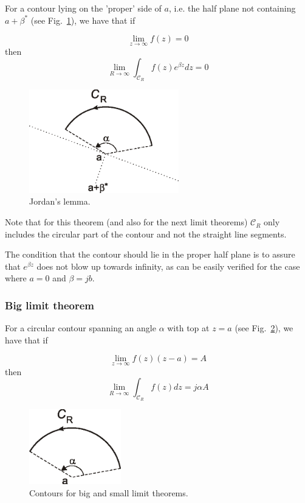 For a contour lying on the 'proper' side of $a$, i.e. the half plane not
containing $a+\beta^*$ (see Fig.~\ref{fig-jordan}), we have that if  

\begin{equation}
\lim_{z \to \infty} f(z) = 0
\end{equation}
then
\begin{equation}
\lim_{R \to \infty} \int_{\mathcal{C}_R} f(z) e^{\beta z} dz = 0
\end{equation}

\begin{figure}
\centering
\includegraphics[width=6.5cm]{complex/figures/jordan}
\caption{Jordan's lemma.}
\label{fig-jordan}
\end{figure}

Note that for this theorem (and also for the next limit theorems)
${\mathcal{C}_R}$ only includes the circular part of the contour and not the
straight line segments.

The condition that the contour should lie in the proper half plane is to assure
that $e^{\beta z}$ does not blow up towards infinity, as can be easily verified
for the case where $a=0$ and $\beta=jb$.

\subsubsection{Big limit theorem}

For a circular contour spanning an angle $\alpha$ with top at $z=a$ (see
Fig.~\ref{fig-limit-theorem}), we have that if

\begin{equation}
\lim_{z \to \infty}  f(z) (z-a) = A
\end{equation}
then
\begin{equation}
\lim_{R \to \infty} \int_{\mathcal{C}_R} f(z) dz = j \alpha A
\end{equation}

\begin{figure}
\centering
\includegraphics[width=4cm]{complex/figures/limit_theorem}
\caption{Contours for big and small limit theorems.}
\label{fig-limit-theorem}
\end{figure}

